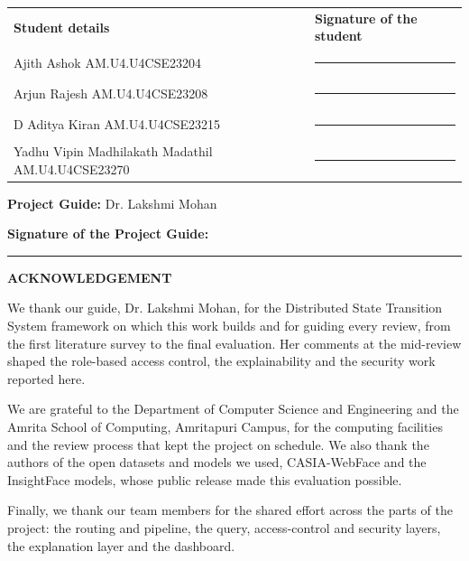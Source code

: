 \documentclass[12pt,a4paper,oneside]{report}
\begin{document}
\noindent
\begin{tabular}{@{}p{}p{}@{}}
\textbf{Student details} & \textbf{Signature of the student} \\[14pt]

Ajith Ashok\newline
AM.U4.U4CSE23204
& \rule{0.30\textwidth}{0.4pt} \\[18pt]

Arjun Rajesh\newline
AM.U4.U4CSE23208
& \rule{0.30\textwidth}{0.4pt} \\[18pt]

D Aditya Kiran\newline
AM.U4.U4CSE23215
& \rule{0.30\textwidth}{0.4pt} \\[18pt]

Yadhu Vipin Madhilakath Madathil\newline
AM.U4.U4CSE23270
& \rule{0.30\textwidth}{0.4pt}
\end{tabular}

\vspace{0.8cm}

\noindent
\textbf{Project Guide:} Dr. Lakshmi Mohan

\vspace{0.5cm}

\noindent
\textbf{Signature of the Project Guide:}
\rule{4cm}{0.4pt}

\clearpage
\pagestyle{plain}

{}
{\centering \Large\bfseries ACKNOWLEDGEMENT\par}
We thank our guide, Dr. Lakshmi Mohan, for the Distributed State Transition System framework on which this work builds and for guiding every review, from the first literature survey to the final evaluation. Her comments at the mid-review shaped the role-based access control, the explainability and the security work reported here.

We are grateful to the Department of Computer Science and Engineering and the Amrita School of Computing, Amritapuri Campus, for the computing facilities and the review process that kept the project on schedule. We also thank the authors of the open datasets and models we used, CASIA-WebFace and the InsightFace models, whose public release made this evaluation possible.

Finally, we thank our team members for the shared effort across the parts of the project: the routing and pipeline, the query, access-control and security layers, the explanation layer and the dashboard.
\end{document}
